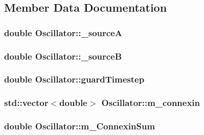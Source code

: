 \subsection{Member Data Documentation}
\hypertarget{class_oscillator_a968627d069d5f0c44d8134718a01237f}{
\subsubsection[{\+\_\+source\+A}]{\setlength{\rightskip}{0pt plus 5cm}double Oscillator\+::\+\_\+source\+A}}\label{class_oscillator_a968627d069d5f0c44d8134718a01237f}
\hypertarget{class_oscillator_a5a144fd5dd7cbcbfc47d7c9013d330b8}{
\subsubsection[{\+\_\+source\+B}]{\setlength{\rightskip}{0pt plus 5cm}double Oscillator\+::\+\_\+source\+B}}\label{class_oscillator_a5a144fd5dd7cbcbfc47d7c9013d330b8}
\hypertarget{class_oscillator_a4db30c0516d078b69426aad65bf13022}{
\subsubsection[{guard\+Timestep}]{\setlength{\rightskip}{0pt plus 5cm}double Oscillator\+::guard\+Timestep}}\label{class_oscillator_a4db30c0516d078b69426aad65bf13022}
\hypertarget{class_oscillator_a94d86971a2a425d2e2492962491dc01b}{
\subsubsection[{m\+\_\+connexin}]{\setlength{\rightskip}{0pt plus 5cm}std\+::vector$<$double$>$ Oscillator\+::m\+\_\+connexin}}\label{class_oscillator_a94d86971a2a425d2e2492962491dc01b}
\hypertarget{class_oscillator_a952e781ffe848b06b7b511c54f1d090c}{
\subsubsection[{m\+\_\+\+Connexin\+Sum}]{\setlength{\rightskip}{0pt plus 5cm}double Oscillator\+::m\+\_\+\+Connexin\+Sum}}\label{class_oscillator_a952e781ffe848b06b7b511c54f1d090c}
